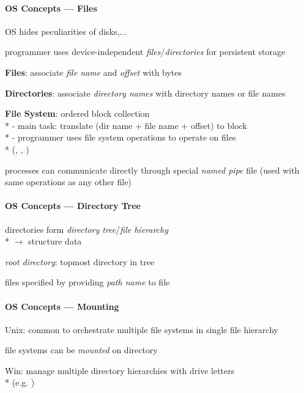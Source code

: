 \paragraph{OS Concepts --- Files}
\begin{items}
	\item OS hides peculiarities of disks,...
	\item programmer uses device-independent \emph{files}/\emph{directories} for persistent storage
	\item \textbf{Files}: associate \emph{file name} and \emph{offset} with bytes
	\item \textbf{Directories}: associate \emph{directory names} with directory names or file names
	\item \textbf{File System}: ordered block collection \\*
		- main task: translate (dir name + file name + offset) to block \\*
		- programmer uses file system operations to operate on files \\* \phantom{-} (, , )
	\item processes can communicate directly through special \emph{named pipe} file (used with same operations as any other file)
\end{items}

\paragraph{OS Concepts --- Directory Tree}
\begin{items}
	\item directories form \emph{directory tree}/\emph{file hierarchy} \\*
		\( \to \) structure data
	\item \emph{root directory}: topmost directory in tree
	\item files specified by providing \emph{path name} to file
\end{items}

\paragraph{OS Concepts --- Mounting}
\begin{items}
	\item Unix: common to orchestrate multiple file systems in single file hierarchy
	\item file systems can be \emph{mounted} on directory
	\item Win: manage multiple directory hierarchies with drive letters
		\\*
		(e.g. )
\end{items}

